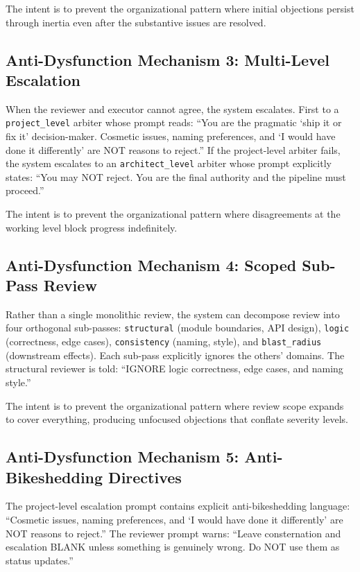 \documentclass[11pt,a4paper]{article}
\begin{document}
The intent is to prevent the organizational pattern where initial objections persist through inertia even after the substantive issues are resolved.

\subsection{Anti-Dysfunction Mechanism 3: Multi-Level Escalation}

When the reviewer and executor cannot agree, the system escalates. First to a \texttt{project\_level} arbiter whose prompt reads: ``You are the pragmatic `ship it or fix it' decision-maker. Cosmetic issues, naming preferences, and `I would have done it differently' are NOT reasons to reject.'' If the project-level arbiter fails, the system escalates to an \texttt{architect\_level} arbiter whose prompt explicitly states: ``You may NOT reject. You are the final authority and the pipeline must proceed.''

The intent is to prevent the organizational pattern where disagreements at the working level block progress indefinitely.

\subsection{Anti-Dysfunction Mechanism 4: Scoped Sub-Pass Review}

Rather than a single monolithic review, the system can decompose review into four orthogonal sub-passes: \texttt{structural} (module boundaries, API design), \texttt{logic} (correctness, edge cases), \texttt{consistency} (naming, style), and \texttt{blast\_radius} (downstream effects). Each sub-pass explicitly ignores the others' domains. The structural reviewer is told: ``IGNORE logic correctness, edge cases, and naming style.''

The intent is to prevent the organizational pattern where review scope expands to cover everything, producing unfocused objections that conflate severity levels.

\subsection{Anti-Dysfunction Mechanism 5: Anti-Bikeshedding Directives}

The project-level escalation prompt contains explicit anti-bikeshedding language: ``Cosmetic issues, naming preferences, and `I would have done it differently' are NOT reasons to reject.'' The reviewer prompt warns: ``Leave consternation and escalation BLANK unless something is genuinely wrong. Do NOT use them as status updates.''
\end{document}
